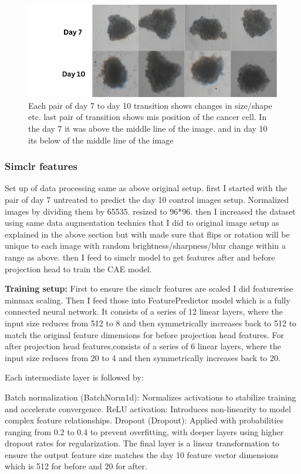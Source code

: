 \begin{figure}[H]
  \centering
  \includegraphics[scale=0.5]{figures/pproblem.png} 
  \caption{Each pair of day 7 to day 10 transition shows changes in size/shape etc. last pair of transition shows mis position of the cancer cell. In the day 7 it was above the middle line of the image. and in day 10 its below of the middle line of the image}
  \label{fig:mispo}
\end{figure}

\subsubsection*{Simclr features}
Set up of data processing same as above original setup.
first I started with the pair of day 7 untreated to predict the day 10 control images setup. Normalized images by dividing them by 65535. resized to 96*96. then
I increased the dataset using same data augmentation technics that I did to original image setup as explained in the above section but with made sure that flips or rotation will be unique to each image with random brightness/sharpness/blur change within a range as above. then I feed to simclr model 
to get features after and before projection head to train the CAE model. 

\textbf{Training setup:} First to ensure the simclr features are scaled I did featurewise minmax scaling. Then I feed those into FeaturePredictor model which is a fully 
connected neural network. It consists of a series of 12 linear layers, where the input size reduces from 512 to 8 and then symmetrically increases back to 512 to
 match the original feature dimensions for before projection head features. For after projection head features,consists of a series of 6 linear layers, where the 
 input size reduces from 20 to 4 and then symmetrically increases back to 20.

Each intermediate layer is followed by:

Batch normalization (BatchNorm1d): Normalizes activations to stabilize training and accelerate convergence.
ReLU activation: Introduces non-linearity to model complex feature relationships.
Dropout (Dropout): Applied with probabilities ranging from 0.2 to 0.4 to prevent overfitting, with deeper layers using higher dropout rates for regularization.
The final layer is a linear transformation to ensure the output feature size matches the day 10 feature vector dimensions which is 512 for before and 20 for after.

